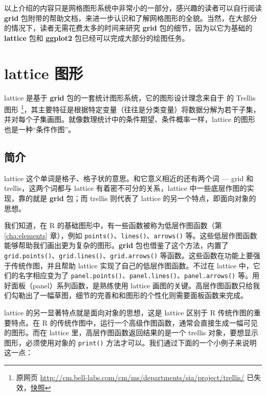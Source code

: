 \documentclass[
  b5paper,
  UTF8,twoside]{book}
\begin{document}
以上介绍的内容只是网格图形系统中非常小的一部分，感兴趣的读者可以自行阅读 \textbf{grid} 包附带的帮助文档，来进一步认识和了解网格图形的全貌。当然，在大部分的情况下，读者无需花费太多的时间来研究 \textbf{grid} 包的细节，因为以它为基础的 \textbf{lattice} 包和 \textbf{ggplot2} 包已经可以完成大部分的绘图任务。

\section{lattice 图形}\label{lattice-ux56feux5f62}

lattice \citep{Sarkar08} 是基于 \textbf{grid} 包的一套统计图形系统，它的图形设计理念来自于 \citet{Cleveland93} 的 Trellis 图形 \footnote{原网页 \url{http://cm.bell-labs.com/cm/ms/departments/sia/project/trellis/} 已失效，\href{https://web.archive.org/web/20081019072358/http://cm.bell-labs.com/cm/ms/departments/sia/project/trellis/}{快照}}，其主要特征是根据特定变量（往往是分类变量）将数据分解为若干子集，并对每个子集画图。就像数理统计中的条件期望、条件概率一样，lattice 的图形也是一种``条件作图''。

\subsection{简介}\label{subsec:lattice-intro}

lattice 这个单词是格子、格子状的意思。和它意义相近的还有两个词 --- grid 和 trellis，这两个词都与 lattice 有着密不可分的关系，lattice 中一些底层作图的实现，靠的就是 \textbf{grid} 包；而 trellis 则代表了 lattice 的另一个特点，即面向对象的思想。

我们知道，在 R 的基础图形中，有一些函数被称为低层作图函数（第 \ref{cha:elements} 章），例如 \texttt{points()}、\texttt{lines()}、\texttt{arrows()} 等。这些低层作图函数能够帮助我们画出更为复杂的图形。\textbf{grid} 包也借鉴了这个方法，内置了 \texttt{grid.points()}、\texttt{grid.lines()}、\texttt{grid.arrows()} 等函数。这些函数在功能上要强于传统作图，并且帮助 lattice 实现了自己的低层作图函数。不过在 lattice 中，它们的名字相应变为了 \texttt{panel.points()}、\texttt{panel.lines()}、\texttt{panel.arrows()} 等。用好面板（panel）系列函数，是熟练使用 lattice 画图的关键。高层作图函数只给我们勾勒出了一幅草图，细节的完善和和图形的个性化则需要面板函数来完成。

lattice 的另一显著特点就是面向对象的思想，这是 lattice 区别于 R 传统作图的重要特点。在 R 的传统作图中，运行一个高级作图函数，通常会直接生成一幅可见的图形。而在 lattice 里，高层作图函数返回结果的是一个 trellis 对象，要想显示图形，必须使用对象的 \texttt{print()} 方法才可以。我们通过下面的一个小例子来说明这一点：
\end{document}
